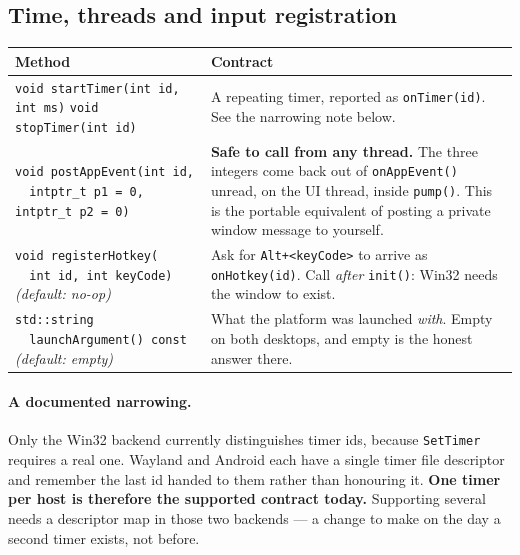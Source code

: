 \documentclass[11pt,a4paper]{article}
\begin{document}
\subsection{Time, threads and input registration}

\begin{longtable}{@{}p{}p{}@{}}
\toprule
\textbf{Method} & \textbf{Contract} \\
\midrule
\endhead
\texttt{void startTimer(int id, int ms)} \newline
\texttt{void stopTimer(int id)} &
A repeating timer, reported as \texttt{onTimer(id)}. See the narrowing note
below. \\
\addlinespace
\texttt{void postAppEvent(int id,} \newline \texttt{\ \ intptr\_t p1 = 0,
intptr\_t p2 = 0)} &
\textbf{Safe to call from any thread.} The three integers come back out of
\texttt{onAppEvent()} unread, on the UI thread, inside \texttt{pump()}. This is
the portable equivalent of posting a private window message to yourself. \\
\addlinespace
\texttt{void registerHotkey(} \newline \texttt{\ \ int id, int keyCode)}
\newline \emph{(default: no-op)} &
Ask for \texttt{Alt+<keyCode>} to arrive as \texttt{onHotkey(id)}. Call
\emph{after} \texttt{init()}: Win32 needs the window to exist. \\
\addlinespace
\texttt{std::string} \newline \texttt{\ \ launchArgument() const}
\newline \emph{(default: empty)} &
What the platform was launched \emph{with}. Empty on both desktops, and empty is
the honest answer there. \\
\bottomrule
\end{longtable}

\paragraph{A documented narrowing.} Only the Win32 backend currently
distinguishes timer ids, because \texttt{SetTimer} requires a real one. Wayland
and Android each have a single timer file descriptor and remember the last id
handed to them rather than honouring it. \textbf{One timer per host is therefore
the supported contract today.} Supporting several needs a descriptor map in
those two backends --- a change to make on the day a second timer exists, not
before.
\end{document}
